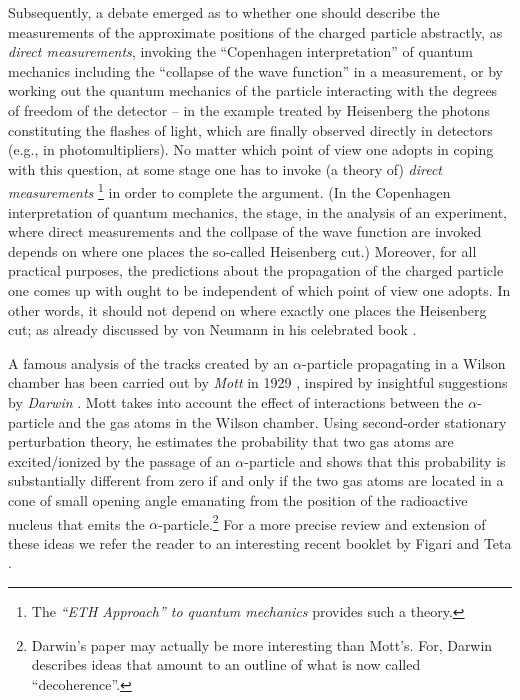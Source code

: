 \documentclass[12pt]{article}
\begin{document}
Subsequently, a debate emerged as to whether one should describe the measurements of the approximate positions of the 
charged particle abstractly, as \textit{direct measurements}, invoking the ``Copenhagen interpretation'' of 
quantum mechanics including the ``collapse of the wave function'' in a measurement, or by working out the 
quantum mechanics of the particle interacting with the degrees of freedom 
of the detector -- in the example treated by Heisenberg the photons constituting the flashes of light, which are finally 
observed directly in detectors (e.g., in photomultipliers). No matter which point of view one adopts in coping with
this question, at some stage one has to invoke (a theory of) \textit{direct measurements}
\footnote{The \textit{``ETH Approach'' to quantum mechanics} \cite{Fr} provides such a theory.} 
in order to complete the argument. (In the Copenhagen interpretation of quantum mechanics, the stage, 
in the analysis of an experiment, where direct measurements and the collpase of the wave function are invoked 
depends on where one places the so-called Heisenberg cut.) Moreover, for all practical purposes, the predictions 
about the propagation of the charged particle one comes up with ought to be independent of which point 
of view one adopts. In other words, it should not depend on where exactly one places the Heisenberg cut; as already discussed by von Neumann in his celebrated book \cite{vN}. 

A famous analysis of the tracks created by an $\alpha$-particle propagating in a Wilson chamber has been 
carried out by \textit{ Mott} in 1929 \cite{Mott}, inspired by insightful suggestions by \textit{Darwin} \cite{Darwin}. 
Mott takes into account the effect of interactions between the $\alpha$-particle and the gas atoms in the 
Wilson chamber. Using second-order stationary perturbation theory, he estimates the probability that two gas 
atoms are excited/ionized by the passage of an $\alpha$-particle and shows that this probability is substantially different 
from zero if and only if the two gas atoms are located in a cone of small opening angle emanating from the position 
of the radioactive nucleus that emits the $\alpha$-particle.\footnote{Darwin's paper may actually be more interesting 
than Mott's. For, Darwin describes ideas that amount to an outline of what is now called ``decoherence''.} For a more precise review and extension of these ideas we refer the reader to an interesting recent booklet by Figari and Teta \cite{FigTeta}.
\end{document}
